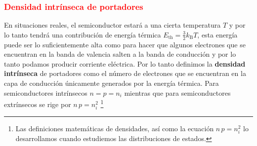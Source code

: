 \subsubsection{\textcolor{red}{Densidad intrínseca de portadores}} \label{sec: Densidad intrinseca de portadores}
En situaciones reales, el semiconductor estará a una cierta temperatura $T$ y por lo tanto tendrá una contribución de energía térmica $E_\mathrm{th}=\frac{3}{2}k_\mathrm{B}T$, esta energía puede ser lo suficientemente alta como para hacer que algunos electrones que se encuentran en la banda de valencia salten a la banda de conducción y por lo tanto podamos producir corriente eléctrica. Por lo tanto definimos la \textbf{densidad intrínseca} de portadores como el número de electrones que se encuentran en la capa de conducción únicamente generados por la energía térmica. Para semiconductores intrínsecos $n=p=n_i$ mientras que para semiconductores extrínsecos se rige por $n\,p=n_i^2$ \footnote{Las definiciones matemáticas de densidades, así como la ecuación $n\,p=n_i^2$ lo desarrollamos cuando estudiemos las distribuciones de estados.} \newpage
